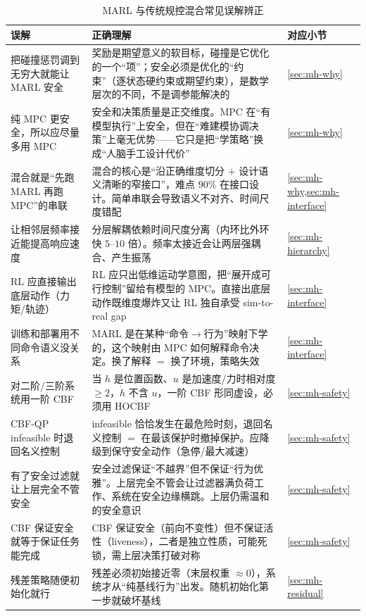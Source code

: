 \begin{table}[H]\centering\footnotesize
\caption{MARL 与传统规控混合常见误解辨正}
\label{tab:mh-misconceptions}
\begin{tabular}{p{4.4cm}p{6.4cm}p{1.8cm}}
\toprule
误解 & 正确理解 & 对应小节 \\
\midrule
把碰撞惩罚调到无穷大就能让 MARL 安全 & 奖励是期望意义的软目标，碰撞是它优化的一个“项”；安全必须是优化的“约束”（逐状态硬约束或期望约束），是数学层次的不同，不是调参能解决的 & \cref{sec:mh-why} \\
纯 MPC 更安全，所以应尽量多用 MPC & 安全和决策质量是正交维度。MPC 在“有模型执行”上安全，但在“难建模协调决策”上毫无优势——它只是把“学策略”换成“人脑手工设计代价” & \cref{sec:mh-why} \\
混合就是“先跑 MARL 再跑 MPC”的串联 & 混合的核心是“沿正确维度切分 $+$ 设计语义清晰的窄接口”，难点 $90\%$ 在接口设计。简单串联会导致语义不对齐、时间尺度错配 & \cref{sec:mh-why,sec:mh-interface} \\
让相邻层频率接近能提高响应速度 & 分层解耦依赖时间尺度分离（内环比外环快 $5$--$10$ 倍）。频率太接近会让两层强耦合、产生振荡 & \cref{sec:mh-hierarchy} \\
RL 应直接输出底层动作（力矩/轨迹） & RL 应只出低维运动学意图，把“展开成可行控制”留给有模型的 MPC。直接出底层动作既维度爆炸又让 RL 独自承受 sim-to-real gap & \cref{sec:mh-interface} \\
训练和部署用不同命令语义没关系 & MARL 是在某种“命令$\to$行为”映射下学的，这个映射由 MPC 如何解释命令决定。换了解释 $=$ 换了环境，策略失效 & \cref{sec:mh-interface} \\
对二阶/三阶系统用一阶 CBF & 当 $h$ 是位置函数、$u$ 是加速度/力时相对度 $\ge2$，$\dot h$ 不含 $u$，一阶 CBF 形同虚设，必须用 HOCBF & \cref{sec:mh-safety} \\
CBF-QP infeasible 时退回名义控制 & infeasible 恰恰发生在最危险时刻，退回名义控制 $=$ 在最该保护时撤掉保护。应降级到保守安全动作（急停/最大减速） & \cref{sec:mh-safety} \\
有了安全过滤就让上层完全不管安全 & 安全过滤保证“不越界”但不保证“行为优雅”。上层完全不管会让过滤器满负荷工作、系统在安全边缘横跳。上层仍需温和的安全意识 & \cref{sec:mh-safety} \\
CBF 保证安全就等于保证任务能完成 & CBF 保证安全（前向不变性）但不保证活性（liveness），二者是独立性质，可能死锁，需上层决策打破对称 & \cref{sec:mh-safety} \\
残差策略随便初始化就行 & 残差必须初始接近零（末层权重 $\approx0$），系统才从“纯基线行为”出发。随机初始化第一步就破坏基线 & \cref{sec:mh-residual} \\

\end{tabular}
\end{table}
